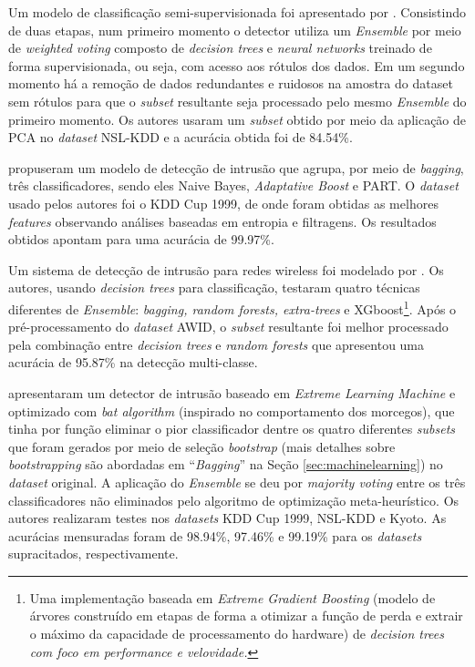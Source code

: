 Um modelo de classificação semi-supervisionada foi apresentado por . Consistindo de duas etapas, num primeiro momento o detector utiliza um \textit{Ensemble} por meio de \textit{weighted voting} composto de \textit{decision trees} e \textit{neural networks} treinado de forma supervisionada, ou seja, com acesso aos rótulos dos dados. Em um segundo momento há a remoção de dados redundantes e ruidosos na amostra do dataset sem rótulos para que o \textit{subset} resultante seja processado pelo mesmo \textit{Ensemble} do primeiro momento. Os autores usaram um \textit{subset} obtido por meio da aplicação de PCA no \textit{dataset} NSL-KDD e a acurácia obtida foi de 84.54\%.

 propuseram um modelo de detecção de intrusão que agrupa, por meio de \textit{bagging}, três classificadores, sendo eles Naive Bayes, \textit{Adaptative Boost} e PART. O \textit{dataset} usado pelos autores foi o KDD Cup 1999, de onde foram obtidas as melhores \textit{features} observando análises baseadas em entropia e filtragens. Os resultados obtidos apontam para uma acurácia de 99.97\%.

Um sistema de detecção de intrusão para redes wireless foi modelado por . Os autores, usando \textit{decision trees} para classificação, testaram quatro técnicas diferentes de \textit{Ensemble}: \textit{bagging, random forests, extra-trees} e XGboost\footnote{Uma implementação baseada em \textit{Extreme Gradient Boosting} (modelo de árvores construído em etapas de forma a otimizar a função de perda e extrair o máximo da capacidade de processamento do hardware) de \textit{decision trees com foco em performance e velovidade. }}. Após o pré-processamento do \textit{dataset} AWID, o \textit{subset} resultante foi melhor processado pela combinação entre \textit{decision trees} e \textit{random forests} que apresentou uma acurácia de 95.87\% na detecção multi-classe.


 apresentaram um detector de intrusão baseado em \textit{Extreme Learning Machine} e optimizado com \textit{bat algorithm} (inspirado no comportamento dos morcegos), que tinha por função eliminar o pior classificador dentre os quatro diferentes \textit{subsets} que foram gerados por meio de seleção \textit{bootstrap} (mais detalhes sobre \textit{bootstrapping} são abordadas em ``\textit{Bagging}'' na Seção \ref{sec:machinelearning}) no \textit{dataset} original. A aplicação do \textit{Ensemble} se deu por \textit{majority voting} entre os três classificadores não eliminados pelo algoritmo de optimização meta-heurístico. Os autores realizaram testes nos \textit{datasets} KDD Cup 1999, NSL-KDD e Kyoto. As acurácias mensuradas foram de 98.94\%, 97.46\% e 99.19\% para os \textit{datasets} supracitados, respectivamente.


